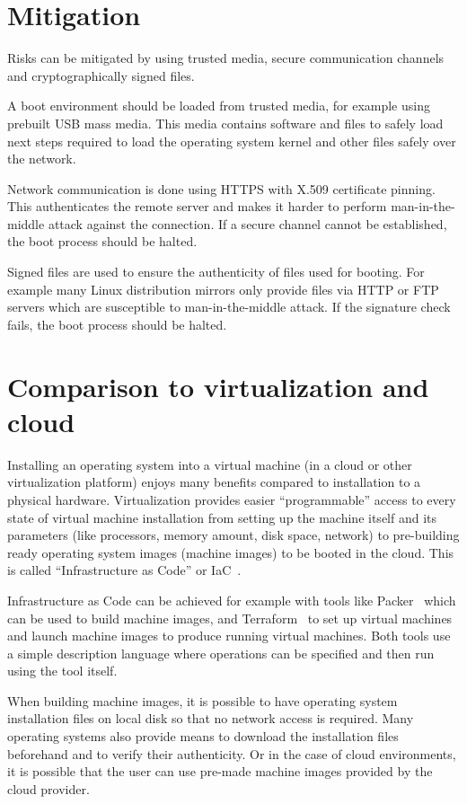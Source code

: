 \section{Mitigation}

Risks can be mitigated by using trusted media, secure communication
channels and cryptographically signed files.

A boot environment should be loaded from trusted media, for example
using prebuilt USB mass media. This media contains software and files
to safely load next steps required to load the operating system kernel
and other files safely over the network.

Network communication is done using HTTPS with X.509 certificate
pinning. This authenticates the remote server and makes it harder to
perform man-in-the-middle attack against the connection. If a secure
channel cannot be established, the boot process should be halted.

Signed files are used to ensure the authenticity of files used for
booting. For example many Linux distribution mirrors only provide
files via HTTP or FTP servers which are susceptible to
man-in-the-middle attack. If the signature check fails, the boot
process should be halted.


\section{Comparison to virtualization and cloud}

Installing an operating system into a virtual machine (in a cloud or
other virtualization platform) enjoys many benefits compared to
installation to a physical hardware. Virtualization provides easier
``programmable'' access to every state of virtual machine installation
from setting up the machine itself and its parameters (like
processors, memory amount, disk space, network) to pre-building ready
operating system images (machine images) to be booted in the
cloud. This is called ``Infrastructure as Code'' or
IaC~\cite{spinellis}.

Infrastructure as Code can be achieved for example with tools like
Packer~\cite{packer} which can be used to build machine images, and
Terraform~\cite{terraform} to set up virtual machines and launch
machine images to produce running virtual machines. Both tools use a
simple description language where operations can be specified and then
run using the tool itself.

When building machine images, it is possible to have operating system
installation files on local disk so that no network access is
required. Many operating systems also provide means to download the
installation files beforehand and to verify their authenticity. Or in
the case of cloud environments, it is possible that the user can use
pre-made machine images provided by the cloud provider.

